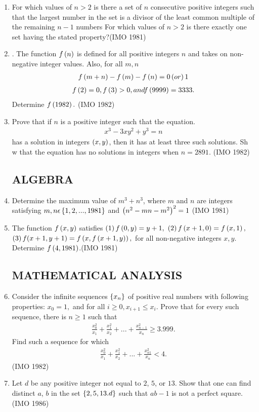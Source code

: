 \begin{enumerate}
 \item {} For which values of $n > 2$ is there a set of $n$ consecutive positive integers such that     the largest number in the set is a divisor of the least common multiple of the remaining $n-1$ numbers
	 For which values of $n > 2$ is there exactly one set having the stated property?\hfill(IMO 1981)
\item . The function $f\left(n\right)$ is defined for all positive integers $n$ and takes on non-negative integer values. Also, for all $m,n$
  \begin{align*}f\left(m + n\right) - f\left(m\right) - f\left(n\right) = 0  \left(or\right) 1 \end{align*}
 \begin{align*}f\left(2\right) = 0  , f\left(3\right) > 0,and  f\left(9999\right) = 3333.\end{align*}
       Determine $f\left(1982\right).$ \hfill(IMO 1982)
\item Prove that if $n$ is a positive integer such that the equation. \begin{align*}x^3 - 3xy^2 + y^3 =
n \end{align*}  has a solution in integers $\left(x, y\right)$, then it has at least three such solutions. Sh
w that the equation has no solutions in integers when $n = 2891.$ \hfill(IMO 1982)
		\subsection*{ALGEBRA}
 \item Determine the maximum value of $m^{3}+n^{3}$, where $m$ and $n$ are integers satisfying $m, n  \epsilon  \left\{1,2,..., 1981\right\}$ and $\left(n^{2}-mn-m^{2}\right)^{2}=1$ \hfill(IMO 1981)
\item The function $f\left(x, y\right)$ satisfies
 $\left(1\right) f\left(0, y\right) = y + 1,$ 
 $\left(2\right) f\left(x + 1, 0\right) = f\left(x, 1\right),$ 
  $\left(3\right) f(x + 1, y + 1) = f\left(x, f\left(x + 1, y\right)\right),$ 
  for all non-negative integers $x, y$. Determine $ f\left(4,1981\right)$.\hfill(IMO 1981)
		\subsection*{MATHEMATICAL ANALYSIS}
	\item Consider the infinite sequences $\left\{x_n\right\}$ of positive real numbers with following properties:     
             $ x_{0}=1,$ and for  all  $i \geq 0, x_{i+1} \leq x_i.$ 
  Prove that for every such sequence, there is $n \geq 1$ such that
                      \begin{align*} \frac{x^{2}_{0}}{x_{1}}+ \frac{x^{2}_{1}}{x_{2}}+ ...+\frac{x^{2}_{n- 1}}{x_{n}} \geq 3.999.\end{align*}
  Find such a sequence for which
                    \begin{align*} \frac{x^{2}_{0}}{x_{1}}+ \frac{x^{2}_{1}}{x_{2}}+ ...+\frac{x^{2        }_{n1}}{x_{n}}< 4.\end{align*} \hfill(IMO 1982)
                    \item  Let $d$ be any positive integer not equal to $2$, $5$, or $13$. Show that one can find distinct $a$, $b$ in the set $\left\{2, 5, 13. d\right\}$ such that $ab-1$ is not a perfect square.\hfill(IMO 1986)


\end{enumerate}
